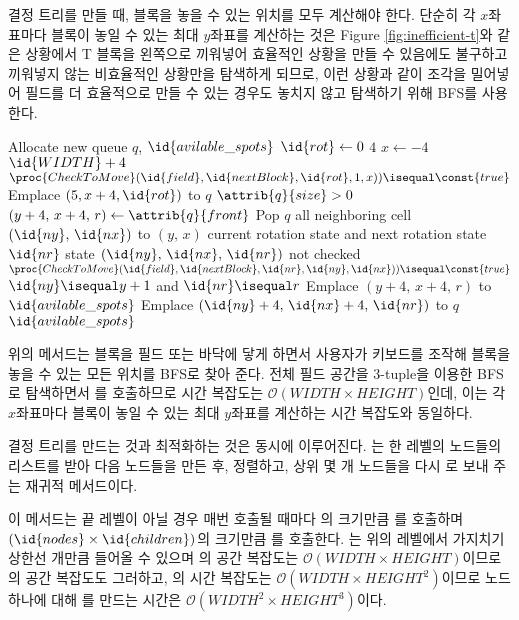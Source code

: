 결정 트리를 만들 때, 블록을 놓을 수 있는 위치를 모두 계산해야 한다. 단순히 각 $x$좌표마다
블록이 놓일 수 있는 최대 $y$좌표를 계산하는 것은 Figure \ref{fig:inefficient-t}와
같은 상황에서 T 블록을 왼쪽으로 끼워넣어 효율적인 상황을 만들 수 있음에도 불구하고 끼워넣지 않는
비효율적인 상황만을 탐색하게 되므로, 이런 상황과 같이 조각을 밀어넣어 필드를 더 효율적으로 만들
수 있는 경우도 놓치지 않고 탐색하기 위해 BFS를 사용한다.

\begin{codebox}
\li Allocate new queue $q$, $\id{avilable\_spots}$
\li \For $\id{rot} \gets 0$ \To $4$ \Do
\li     \For $x \gets -4$ \To $\id{WIDTH} + 4$ \Do
\li         \If $\proc{CheckToMove}(\id{field}, \id{nextBlock}, \id{rot}, 1, x)) \isequal \const{true}$ \Then
\li             Emplace $(5, x + 4, \id{rot})$ to $q$
            \End
        \End
    \End
\li \While $\attrib{q}{size} > 0$ \Do
\li     $(y + 4,\,x + 4,\,r) \gets \attrib{q}{front}$
\li     Pop $q$
\li     \For all neighboring cell $(\id{ny},\,\id{nx})$ to $(y,\,x)$ \Do
\li         \For current rotation state and next rotation state $\id{nr}$ \Do
\li             \If state $(\id{ny},\,\id{nx},\,\id{nr})$ not checked \Do
\li                 \If $\proc{CheckToMove}(\id{field}, \id{nextBlock}, \id{nr}, \id{ny}, \id{nx})) \isequal \const{true}$ \Then
\li                     \If $\id{ny} \isequal y + 1$ and $\id{nr} \isequal r$ \Do
\li                         Emplace $(y + 4,\,x + 4,\,r)$ to $\id{avilable\_spots}$
\li                     \ElseNoIf
\li                         Emplace $(\id{ny} + 4,\,\id{nx} + 4,\,\id{nr})$ to $q$
\li                     \End
                    \End
                \End
            \End
        \End
    \End
\li \Return $\id{avilable\_spots}$
\end{codebox}

위의 메서드는 블록을 필드 또는 바닥에 닿게 하면서 사용자가 키보드를 조작해 블록을 놓을 수 있는 모든
위치를 BFS로 찾아 준다. 전체 필드 공간을 3-tuple을 이용한 BFS로 탐색하면서
를 호출하므로 시간 복잡도는 $\mathcal{O}\left(WIDTH
\times HEIGHT\right)$인데, 이는 각 $x$좌표마다 블록이 놓일 수 있는 최대 $y$좌표를 계산하는
시간 복잡도와 동일하다.

결정 트리를 만드는 것과 최적화하는 것은 동시에 이루어진다. 는 한 레벨의
노드들의 리스트를 받아 다음 노드들을 만든 후, 정렬하고, 상위 몇 개 노드들을 다시 로
보내 주는 재귀적 메서드이다.

이 메서드는 끝 레벨이 아닐 경우 매번 호출될 때마다 의 크기만큼 를 호출하며
$(\id{nodes} \times \id{children})$의 크기만큼 를 호출한다. 는 위의 레벨에서 가지치기 상한선 개만큼 들어올 수 있으며
의 공간 복잡도는 $\mathcal{O}\left(WIDTH \times HEIGHT\right)$이므로
의 공간 복잡도도 그러하고, 의 시간 복잡도는 $\mathcal{O}\left(WIDTH \times HEIGHT^2\right)$이므로 
노드 하나에 대해 를 만드는 시간은 $\mathcal{O}\left(WIDTH^2 \times HEIGHT^3\right)$이다.

